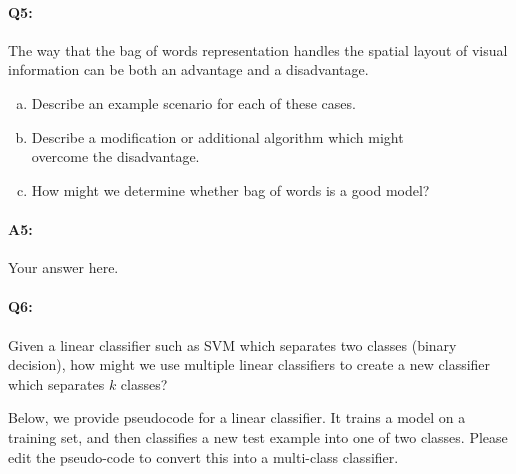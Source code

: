 



\pagebreak
\paragraph{Q5:} The way that the bag of words representation handles the spatial layout of visual information can be both an advantage and a disadvantage.
\begin{enumerate}[(a)]
\item Describe an example scenario for each of these cases.
\item Describe a modification or additional algorithm which might\\overcome the disadvantage.

\item How might we determine whether bag of words is a good model?
\end{enumerate}
\paragraph{A5:} Your answer here.










\pagebreak
\paragraph{Q6:} Given a linear classifier such as SVM which separates two classes (binary decision), how might we use multiple linear classifiers to create a new classifier which separates $k$ classes?

Below, we provide pseudocode for a linear classifier. It trains a model on a training set, and then classifies a new test example into one of two classes. Please edit the pseudo-code to convert this into a multi-class classifier. 

